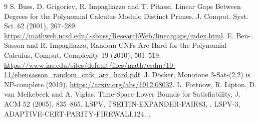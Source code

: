 \documentclass[11pt]{article}
\begin{document}
\begin{thebibliography}{9}
 S. Buss, D. Grigoriev, R. Impagliazzo
and T. Pitassi, Linear Gaps Between Degrees for the
Polynomial Calculus Modulo Distinct Primes,
J. Comput. Syst. Sci. 62 (2001), 267--289.
\url{https://mathweb.ucsd.edu/~sbuss/ResearchWeb/lineargaps/index.html}.
 E. Ben-Sasson and R. Impagliazzo,
Random CNFs Are Hard for the Polynomial Calculus,
Comput. Complexity 19 (2010), 501--519.
\url{https://www.ias.edu/sites/default/files/math/csdm/10-11/ebensasson_random_cnfs_are_hard.pdf}.
 J. D\"ocker,
Monotone 3-Sat-(2,2) is NP-complete (2019),
\url{https://arxiv.org/abs/1912.08032}.
 L. Fortnow, R. Lipton,
D. van Melkebeek and A. Viglas, Time-Space
Lower Bounds for Satisfiability, J. ACM 52 (2005), 835--865.
 LSPV, TSEITIN-EXPANDER-PAIR83,
.
 LSPV-3, ADAPTIVE-CERT-PARITY-FIREWALL124,
.
\end{thebibliography}
\end{document}
